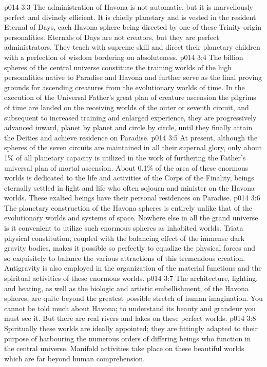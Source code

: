 \vs p014 3:3 The administration of Havona is not automatic, but it is marvellously perfect and divinely efficient. It is chiefly planetary and is vested in the resident Eternal of Days, each Havona sphere being directed by one of these Trinity\hyp{}origin personalities. Eternals of Days are not creators, but they are perfect administrators. They teach with supreme skill and direct their planetary children with a perfection of wisdom bordering on absoluteness.
\vs p014 3:4 The billion spheres of the central universe constitute the training worlds of the high personalities native to Paradise and Havona and further serve as the final proving grounds for ascending creatures from the evolutionary worlds of time. In the execution of the Universal Father’s great plan of creature ascension the pilgrims of time are landed on the receiving worlds of the outer or seventh circuit, and subsequent to increased training and enlarged experience, they are progressively advanced inward, planet by planet and circle by circle, until they finally attain the Deities and achieve residence on Paradise.
\vs p014 3:5 At present, although the spheres of the seven circuits are maintained in all their supernal glory, only about 1\% of all planetary capacity is utilized in the work of furthering the Father’s universal plan of mortal ascension. About 0.1\% of the area of these enormous worlds is dedicated to the life and activities of the Corps of the Finality, beings eternally settled in light and life who often sojourn and minister on the Havona worlds. These exalted beings have their personal residences on Paradise.
\vs p014 3:6 The planetary construction of the Havona spheres is entirely unlike that of the evolutionary worlds and systems of space. Nowhere else in all the grand universe is it convenient to utilize such enormous spheres as inhabited worlds. Triata physical constitution, coupled with the balancing effect of the immense dark gravity bodies, makes it possible so perfectly to equalize the physical forces and so exquisitely to balance the various attractions of this tremendous creation. Antigravity is also employed in the organization of the material functions and the spiritual activities of these enormous worlds.
\vs p014 3:7 The architecture, lighting, and heating, as well as the biologic and artistic embellishment, of the Havona spheres, are quite beyond the greatest possible stretch of human imagination. You cannot be told much about Havona; to understand its beauty and grandeur you must see it. But there are real rivers and lakes on these perfect worlds.
\vs p014 3:8 Spiritually these worlds are ideally appointed; they are fittingly adapted to their purpose of harbouring the numerous orders of differing beings who function in the central universe. Manifold activities take place on these beautiful worlds which are far beyond human comprehension.
